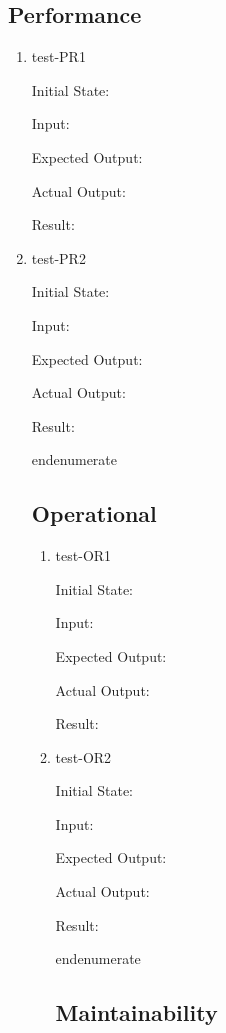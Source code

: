 \documentclass[12pt, titlepage]{article}
\begin{document}
\begin{enumerate}
\begin{enumerate}
\subsection{Performance} \label{section:4.3}

\begin{enumerate}

  \item{test-PR1} \label{test-PR1}

  Initial State:

  Input:

  Expected Output:

  Actual Output:

  Result:

  \item{test-PR2} \label{test-PR2}

  Initial State:

  Input:

  Expected Output:

  Actual Output:

  Result:

end{enumerate}

\subsection{Operational} \label{section:4.4}

\begin{enumerate}

  \item{test-OR1} \label{test-OR1}

  Initial State:

  Input:

  Expected Output:

  Actual Output:

  Result:

  \item{test-OR2} \label{test-OR2}

  Initial State:

  Input:

  Expected Output:

  Actual Output:

  Result:

end{enumerate}

\subsection{Maintainability} \label{section:4.5}


\end{enumerate}
\end{enumerate}
\end{enumerate}
\end{enumerate}
\end{document}
